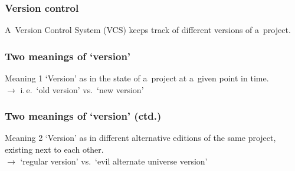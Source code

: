 \documentclass[12pt]{beamer}
\begin{document}
\begin{frame}
  \frametitle{Version control}

  A~\alert{Version Control System} (VCS) keeps track of different versions of
  a~project.
\end{frame}

\begin{frame}
  \frametitle{Two meanings of `version'}

  \begin{block}{Meaning 1}
    `Version' as in the state of a~project at a~given point in time.\\
    $\rightarrow$ i.\,e.\ `old version' vs.\ `new version'
  \end{block}
\end{frame}

\begin{frame}
  \frametitle{Two meanings of `version' (ctd.)}

  \begin{block}{Meaning 2}
    `Version' as in different alternative editions of the same project, existing
    next to each other.\\
    $\to$ `regular version' vs.\ `evil alternate universe version'
  \end{block}
\end{frame}
\end{document}
